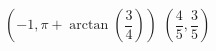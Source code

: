 { $\left( -1, \pi + \arctan\left(\dfrac{3}{4}\right) \right)$ }
{ $\left( \dfrac{4}{5}, \dfrac{3}{5} \right)$}
